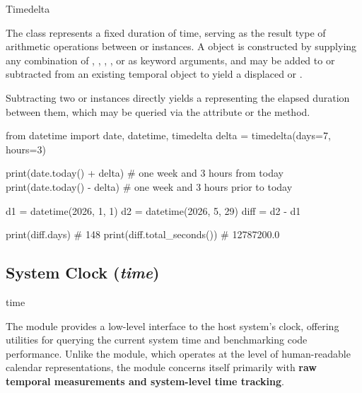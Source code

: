 \documentclass[10pt]{article}
\begin{document}
    \begin{core}{Timedelta}

      The  class represents a fixed duration of time, serving as the result type of arithmetic operations between  or  instances. A  object is constructed by supplying any combination of , , , , or  as keyword arguments, and may be added to or subtracted from an existing temporal object to yield a displaced  or .

      Subtracting two  or  instances directly yields a  representing the elapsed duration between them, which may be queried via the  attribute or the  method.

      \begin{pyconsole}

        from datetime import date, datetime, timedelta
        delta = timedelta(days=7, hours=3)

        print(date.today() + delta)   # one week and 3 hours from today
        print(date.today() - delta)   # one week and 3 hours prior to today

        d1 = datetime(2026, 1, 1)
        d2 = datetime(2026, 5, 29)
        diff = d2 - d1

        print(diff.days)              # 148
        print(diff.total_seconds())   # 12787200.0

      \end{pyconsole}

    \end{core}

  \subsection{System Clock (\textit{time})}

    \begin{core}{time}

      The \href{https://docs.python.org/3/library/time.html}{} module provides a low-level interface to the host system's clock, offering utilities for querying the current system time and benchmarking code performance. Unlike the  module, which operates at the level of human-readable calendar representations, the  module concerns itself primarily with \textbf{raw temporal measurements and system-level time tracking}.

    \end{core}
\end{document}

